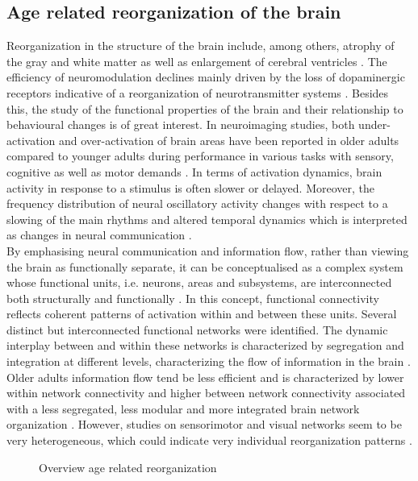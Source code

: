 \subsection{Age related reorganization of the brain}
\label{theory:aging:brain}
Reorganization in the structure of the brain include, among others, atrophy of the gray and white matter as well as enlargement of cerebral ventricles \cite{Fjell2010}. The efficiency of neuromodulation declines mainly driven by the loss of dopaminergic receptors indicative of a reorganization of neurotransmitter systems \cite{Li2001}. Besides this, the study of the functional properties of the brain and their relationship to behavioural changes is of great interest. In neuroimaging studies, both under-activation and over-activation of brain areas have been reported in older adults compared to younger adults during performance in various tasks with sensory, cognitive as well as motor demands \cite{Reuter-Lorenz2010, Sala-Llonch2015}. In terms of activation dynamics, brain activity in response to a stimulus is often slower or delayed. Moreover, the frequency distribution of neural oscillatory activity changes with respect to a slowing of the main rhythms and altered temporal dynamics which is interpreted as changes in neural communication \cite{Courtney2021}.\\ 
By emphasising neural communication and information flow, rather than viewing the brain as functionally separate, it can be conceptualised as a complex system whose functional units, i.e. neurons, areas and subsystems, are interconnected both structurally and functionally \cite{Friston2011,Deery2023}. In this concept, functional connectivity reflects coherent patterns of activation within and between these units. Several distinct but interconnected functional networks were identified. The dynamic interplay between and within these networks is characterized by segregation and integration at different levels, characterizing the flow of information in the brain \cite{Sporns2013}. Older adults information flow tend be less efficient and is characterized by lower within network connectivity and higher between network connectivity associated with a less segregated, less modular and more integrated brain network organization \cite{Sala-Llonch2015,Deery2023, Betzel2014}. However, studies on sensorimotor and visual networks seem to be very heterogeneous, which could indicate very individual reorganization patterns \cite{Deery2023}.

\begin{figure*}[h]
  \caption{Overview age related reorganization}
  \label{fig1:ml_types}
\end{figure*}


